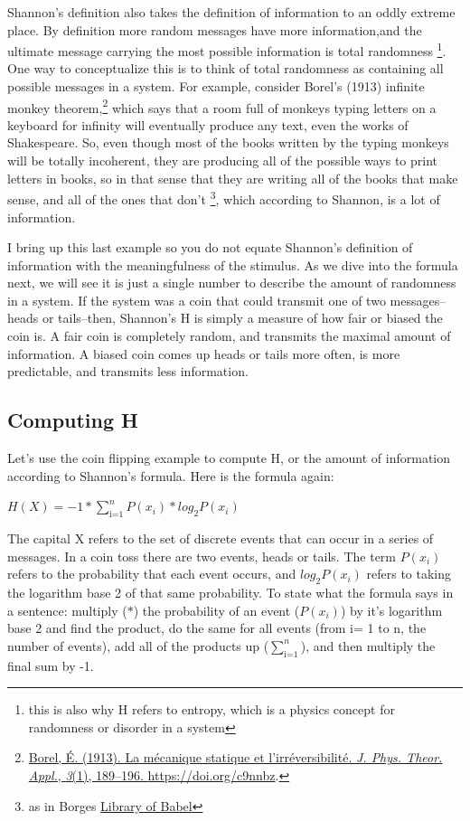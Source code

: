 \documentclass[
  oneside,
  12pt]{crumpbook}
\begin{document}
Shannon's definition also takes the definition of information to an oddly extreme place. By definition more random messages have more information,and the ultimate message carrying the most possible information is total randomness \footnote{this is also why H refers to entropy, which is a physics concept for randomness or disorder in a system}. One way to conceptualize this is to think of total randomness as containing all possible messages in a system. For example, consider Borel's (1913) infinite monkey theorem,\footnote{\protect\hyperlink{ref-borelMecaniqueStatiqueIrreversibilite1913}{Borel, É. (1913). La mécanique statique et l'irréversibilité. \emph{J. Phys. Theor. Appl.}, \emph{3}(1), 189--196. \url{https://doi.org/c9nnbz}}.} which says that a room full of monkeys typing letters on a keyboard for infinity will eventually produce any text, even the works of Shakespeare. So, even though most of the books written by the typing monkeys will be totally incoherent, they are producing all of the possible ways to print letters in books, so in that sense that they are writing all of the books that make sense, and all of the ones that don't \footnote{as in Borges \href{https://en.wikipedia.org/wiki/The_Library_of_Babel}{Library of Babel}}, which according to Shannon, is a lot of information.

I bring up this last example so you do not equate Shannon's definition of information with the meaningfulness of the stimulus. As we dive into the formula next, we will see it is just a single number to describe the amount of randomness in a system. If the system was a coin that could transmit one of two messages--heads or tails--then, Shannon's H is simply a measure of how fair or biased the coin is. A fair coin is completely random, and transmits the maximal amount of information. A biased coin comes up heads or tails more often, is more predictable, and transmits less information.

\hypertarget{computing-h}{%
\subsection{Computing H}\label{computing-h}}

Let's use the coin flipping example to compute H, or the amount of information according to Shannon's formula. Here is the formula again:

\(H(X) = -1*\sum_\text{i=1}^n P(x_i) * log_2 P(x_i)\)

The capital X refers to the set of discrete events that can occur in a series of messages. In a coin toss there are two events, heads or tails. The term \(P(x_i)\) refers to the probability that each event occurs, and \(log_2 P(x_i)\) refers to taking the logarithm base 2 of that same probability. To state what the formula says in a sentence: multiply (\(*\)) the probability of an event (\(P(x_i)\)) by it's logarithm base 2 and find the product, do the same for all events (from i= 1 to n, the number of events), add all of the products up (\(\sum_\text{i=1}^n\)), and then multiply the final sum by -1.
\end{document}
